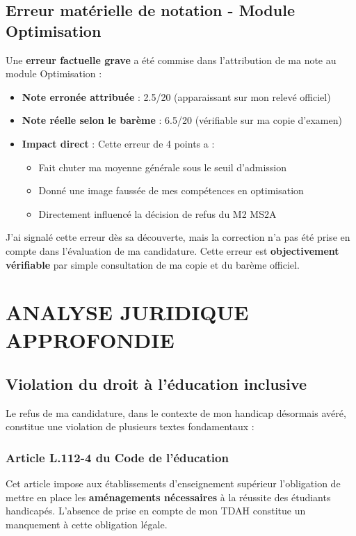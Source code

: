 \documentclass[12pt,french,a4paper]{article}
\begin{document}
\subsection{Erreur matérielle de notation - Module Optimisation}

Une \textbf{erreur factuelle grave} a été commise dans l'attribution de ma note au module Optimisation :

\begin{itemize}
\item \textbf{Note erronée attribuée} : 2.5/20 (apparaissant sur mon relevé officiel)
\item \textbf{Note réelle selon le barème} : 6.5/20 (vérifiable sur ma copie d'examen)
\item \textbf{Impact direct} : Cette erreur de 4 points a :
  \begin{itemize}
  \item Fait chuter ma moyenne générale sous le seuil d'admission
  \item Donné une image faussée de mes compétences en optimisation
  \item Directement influencé la décision de refus du M2 MS2A
  \end{itemize}
\end{itemize}

J'ai signalé cette erreur dès sa découverte, mais la correction n'a pas été prise en compte dans l'évaluation de ma candidature. Cette erreur est \textbf{objectivement vérifiable} par simple consultation de ma copie et du barème officiel.

\section{ANALYSE JURIDIQUE APPROFONDIE}

\subsection{Violation du droit à l'éducation inclusive}

Le refus de ma candidature, dans le contexte de mon handicap désormais avéré, constitue une violation de plusieurs textes fondamentaux :

\subsubsection{Article L.112-4 du Code de l'éducation}

Cet article impose aux établissements d'enseignement supérieur l'obligation de mettre en place les \textbf{aménagements nécessaires} à la réussite des étudiants handicapés. L'absence de prise en compte de mon TDAH constitue un manquement à cette obligation légale.
\end{document}
